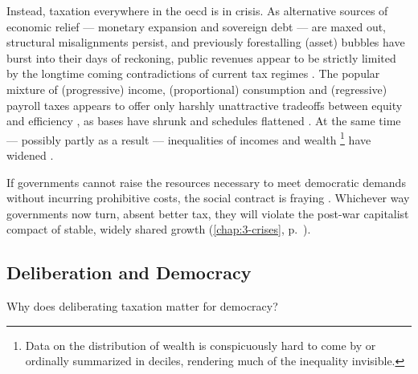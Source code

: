 Instead, taxation everywhere in the \gls{oecd} is in crisis.
As alternative sources of economic relief --- monetary expansion and sovereign debt --- are maxed out, structural misalignments persist, and previously forestalling (asset) bubbles have burst into their days of reckoning, public revenues appear to be strictly limited by the longtime coming contradictions of current tax regimes \citep{Streeck2013}.%
The popular mixture of (progressive) income, (proportional) consumption and (regressive) payroll taxes appears to offer only harshly unattractive tradeoffs between equity and efficiency \citep{McCafferyHines2010}, as bases have shrunk and schedules flattened \citep{Ganghof2006}.
At the same time --- possibly partly as a result --- inequalities of incomes and wealth
\footnote{
	Data on the distribution of wealth is conspicuously hard to come by \citep[158]{Crouch2004} or ordinally summarized in deciles, rendering much of the inequality invisible.
}
 have widened \citep{Butterwegge,Wagner2007,Grabka2007}.

If governments cannot raise the resources necessary to meet democratic demands without incurring prohibitive costs, the social contract is fraying \citep{Crouch2004}.%
Whichever way governments now turn, absent better tax, they will violate the post-war capitalist compact of stable, widely shared growth \citep{Pierson2002,StreeckMertens2010} (\autoref{chap:3-crises}, p.~\pageref{chap:3-crises}).%

\subsection{Deliberation and Democracy}
Why does deliberating taxation matter for democracy?

